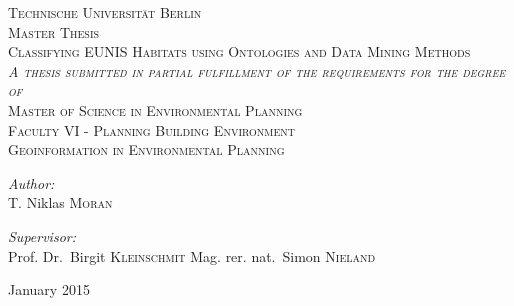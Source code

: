 \begin{titlepage}
\begin{center}

\textsc{\LARGE Technische Universit\"at Berlin}\\[0.5cm]
\textsc{Master Thesis}\\[1.5cm]

\textsc{\Large Classifying EUNIS Habitats using Ontologies and Data Mining
Methods}\\[1.5cm]
\textsc{\textit{A thesis submitted in partial fulfillment of the requirements
for the degree of}}\\[1.25cm]
\textsc{\Large Master of Science in Environmental Planning}\\[1.5cm]
\textsc{Faculty VI - Planning Building Environment\\
 Geoinformation in Environmental Planning}\\[1.5cm]

\noindent
\begin{minipage}{0.5\textwidth}
\begin{flushleft} \large
\emph{Author:}\\
T. Niklas \textsc{Moran}
\end{flushleft}
\end{minipage}%
\begin{minipage}{0.5\textwidth}
\begin{flushright} \large
\emph{Supervisor:} \\
Prof. Dr.~Birgit \textsc{Kleinschmit}
Mag. rer. nat.~Simon \textsc{Nieland}
\end{flushright}
\end{minipage}

\vfill

{\large January 2015}

\end{center}
\end{titlepage}
